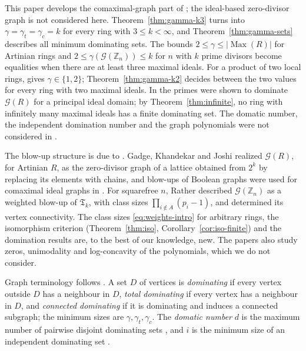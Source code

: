 \documentclass[11pt]{amsart}
\theoremstyle{definition}
\theoremstyle{remark}
\newcommand{\Max}{\operatorname{Max}}
\newcommand{\G}{\mathcal{G}}
\newcommand{\TG}{\mathfrak{T}}
\newcommand{\Z}{\mathbb{Z}}
\begin{document}
This paper develops the comaximal-graph part of \cite{MR15}; the ideal-based zero-divisor graph is
not considered here. Theorem~\ref{thm:gamma-k3} turns \cite[Theorem~3.4, Corollary~3.6]{MR15} into
$\gamma=\gamma_t=\gamma_c=k$ for every ring with $3\le k<\infty$, and Theorem~\ref{thm:gamma-sets}
describes all minimum dominating sets. The bounds $2\le\gamma\le|\Max(R)|$ for Artinian rings
\cite[Theorems~3.7, 3.8]{MR15} and $2\le\gamma(\G(\Z_n))\le k$ for $n$ with $k$ prime divisors
\cite[Corollary~3.10]{MR15} become equalities when there are at least three maximal ideals. For a product of two local rings,
\cite[Proposition~3.3(c)]{MR15} gives $\gamma\in\{1,2\}$; Theorem~\ref{thm:gamma-k2} decides
between the two values for every ring with two maximal ideals. In \cite[Example~3.11(b)]{MR15} the
primes were shown to dominate $\G(R)$ for a principal ideal domain; by Theorem~\ref{thm:infinite},
no ring with infinitely many maximal ideals has a finite dominating set. The domatic number, the
independent domination number and the graph polynomials were not considered in \cite{MR15}.

The blow-up structure is due to \cite{MP11}. Gadge, Khandekar and Joshi \cite{GKJ24} realized
$\G(R)$, for Artinian $R$, as the zero-divisor graph of a lattice obtained from $2^k$ by replacing
its elements with chains, and blow-ups of Boolean graphs were used for comaximal ideal graphs in
\cite{YWLY14,GWY15}. For squarefree $n$, Rather \cite{Ra26d} described $\G(\Z_n)$ as a weighted
blow-up of $\TG_k$, with class sizes $\prod_{i\notin A}(p_i-1)$, and determined its vertex
connectivity. The class sizes \eqref{eq:weights-intro} for arbitrary rings, the isomorphism criterion
(Theorem~\ref{thm:iso}, Corollary~\ref{cor:iso-finite}) and the domination results are, to the best of
our knowledge, new. The papers \cite{Ra26a,Ra26b} also study zeros, unimodality and log-concavity of
the polynomials, which we do not consider.

Graph terminology follows \cite{HHS98,HY13}. A set $D$ of vertices is \emph{dominating} if every
vertex outside $D$ has a neighbour in $D$, \emph{total dominating} if every vertex has a neighbour
in $D$, and \emph{connected dominating} if it is dominating and induces a connected subgraph; the
minimum sizes are $\gamma,\gamma_t,\gamma_c$. The \emph{domatic number} $d$ is the maximum number of
pairwise disjoint dominating sets \cite{CH77}, and $i$ is the minimum size of an independent
dominating set \cite{GH13}.

\end{document}
